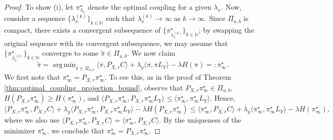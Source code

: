\documentclass{article}
\theoremstyle{definition}
\DeclareMathOperator*{\argmin}{arg\,min}
\begin{document}
\begin{proof}
    To show (i), let $\pi^\star_{\lambda_x}$ denote the optimal coupling for a given $\lambda_x$. Now, consider a sequence $\{\lambda_x^{(k)}\}_{k \in \mathbb{N}}$ such that $\lambda_x^{(k)} \to \infty$ as $k \to \infty$. Since $\Pi_{a, b}$ is compact, there exists a convergent subsequence of $\{\pi^\star_{\lambda_x^{(k)}}\}_{k \in \mathbb{N}}$; by swapping the original sequence with its convergent subsequence, we may assume that $\{\pi^\star_{\lambda_x^{(k)}}\}_{k \in \mathbb{N}}$ converges to some $\tilde{\pi} \in \Pi_{a, b}$. We now claim 
    \begin{equation*}
        \tilde{\pi} = \argmin_{\pi \in \Pi_{a, b}} \langle \pi, P_{X, r} C \rangle + \lambda_y \langle \pi, \pi L_Y \rangle - \lambda H(\pi) =: \pi^\star_\infty.
    \end{equation*}
    We first note that $\pi^\star_\infty = P_{X, r} \pi^\star_\infty$. To see this, as in the proof of Theorem \ref{thm:optimal_coupling_projection_bound}, observe that $P_{X, r} \pi^\star_\infty \in \Pi_{a, b}$, $H(P_{X, r} \pi^\star_\infty) \ge H(\pi^\star_\infty)$, and $\langle P_{X, r} \pi^\star_\infty, P_{X, r} \pi^\star_\infty L_Y \rangle \le \langle \pi^\star_\infty, \pi^\star_\infty L_Y \rangle$. Hence,
    \begin{equation*}
        \langle P_{X, r} \pi^\star_\infty, P_{X, r} C \rangle + \lambda_y \langle P_{X, r} \pi^\star_\infty, P_{X, r} \pi^\star_\infty L_Y \rangle - \lambda H(P_{X, r} \pi^\star_\infty) \le \langle \pi^\star_\infty, P_{X, r} C \rangle + \lambda_y \langle \pi^\star_\infty, \pi^\star_\infty L_Y \rangle - \lambda H(\pi^\star_\infty),
    \end{equation*}
    where we also use $\langle P_{X, r} \pi^\star_\infty, P_{X, r} C \rangle = \langle \pi^\star_\infty, P_{X, r} C \rangle$. By the uniqueness of the minimizer $\pi^\star_\infty$, we conclude that $\pi^\star_\infty = P_{X, r} \pi^\star_\infty$.



\end{proof}
\end{document}
